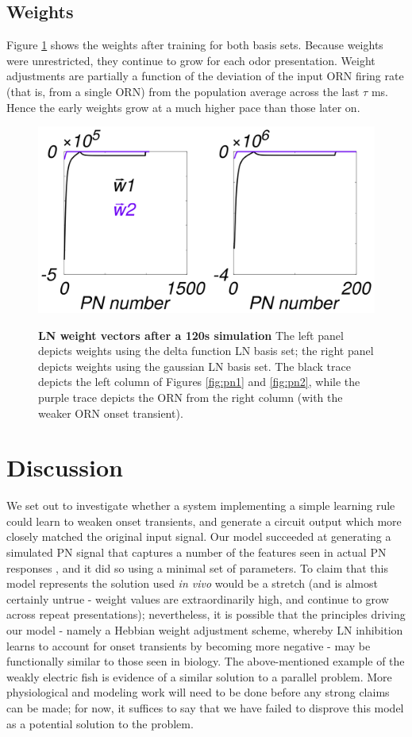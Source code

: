 \documentclass[a4paper,12pt,twoside]{article}
\begin{document}
\subsection{Weights}
Figure \ref{fig:weights} shows the weights after training for both basis sets.  Because weights were unrestricted, they continue to grow for each odor presentation.  Weight adjustments are partially a function of the deviation of the input ORN firing rate (that is, from a single ORN) from the population average across the last $\tau$ ms.  Hence the early weights grow at a much higher pace than those later on.

\begin{figure}
\centering
\caption{\textbf{LN weight vectors after a 120s simulation}  The left panel depicts weights using the delta function LN basis set; the right panel depicts weights using the gaussian LN basis set.  The black trace depicts the left column of Figures \ref{fig:pn1} and \ref{fig:pn2}, while the purple trace depicts the ORN from the right column (with the weaker ORN onset transient). }
\includegraphics[scale=0.7]{2016-09-02_Delta_Gauss_weights.png}
\label{fig:weights}
\end{figure}

\section{Discussion}
We set out to investigate whether a system implementing a simple learning rule could learn to weaken onset transients, and generate a circuit output which more closely matched the original input signal.  Our model succeeded at generating a simulated PN signal that captures a number of the features seen in actual PN responses \cite{Nagel2015}, and it did so using a minimal set of parameters.  To claim that this model represents the solution used \textit{in vivo} would be a stretch (and is almost certainly untrue - weight values are extraordinarily high, and continue to grow across repeat presentations); nevertheless, it is possible that the principles driving our model - namely a Hebbian weight adjustment scheme, whereby LN inhibition learns to account for onset transients by becoming more negative - may be functionally similar to those seen in biology.  The above-mentioned example of the weakly electric fish is evidence of a similar solution to a parallel problem.  More physiological and modeling work will need to be done before any strong claims can be made; for now, it suffices to say that we have failed to disprove this model as a potential solution to the problem.
\end{document}
